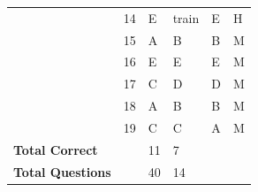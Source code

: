 \documentclass[pageno]{final_paper}
\begin{document}
\begin{table}[]
\begin{tabular}{llllll}
\textbf{}                & 14                                  & E                                          & train                                       & E                                           & H                                       \\
\textbf{}                & 15                                  & A                                          & B                                           & B                                           & M                                       \\
\textbf{}                & 16                                  & E                                          & E                                           & E                                           & M                                       \\
\textbf{}                & 17                                  & C                                          & D                                           & D                                           & M                                       \\
\textbf{}                & 18                                  & A                                          & B                                           & B                                           & M                                       \\
\textbf{}                & 19                                  & C                                          & C                                           & A                                           & M                                       \\ \midrule
\textbf{Total Correct}   &                                     & 11                                         & 7                                           &                                             &                                         \\
\textbf{Total Questions} &                                     & 40                                         & 14                                          &                                             &                                         \\ \bottomrule
\end{tabular}
\end{table}
\end{document}
